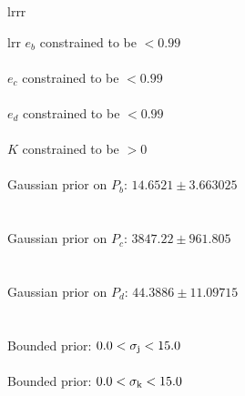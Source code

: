 \documentclass{emulateapj}
\begin{document}
\begin{deluxetable}{lrrr}
\enddata
{}
\label{tab:params}
\end{deluxetable}

\begin{deluxetable}{lrr}
\tablehead{}
\startdata
$e_{b}$ constrained to be $<0.99$ \\\\
$e_{c}$ constrained to be $<0.99$ \\\\
$e_{d}$ constrained to be $<0.99$ \\\\
$K$ constrained to be $>0$\\\\
Gaussian prior on $P_{b}$: $14.6521 \pm 3.663025$ \\\\\\
Gaussian prior on $P_{c}$: $3847.22 \pm 961.805$ \\\\\\
Gaussian prior on $P_{d}$: $44.3886 \pm 11.09715$ \\\\\\
Bounded prior: $0.0 < \sigma_{\rm j} < 15.0$\\\\
Bounded prior: $0.0 < \sigma_{\rm k} < 15.0$\\\\

\enddata
\end{deluxetable}
\end{document}
